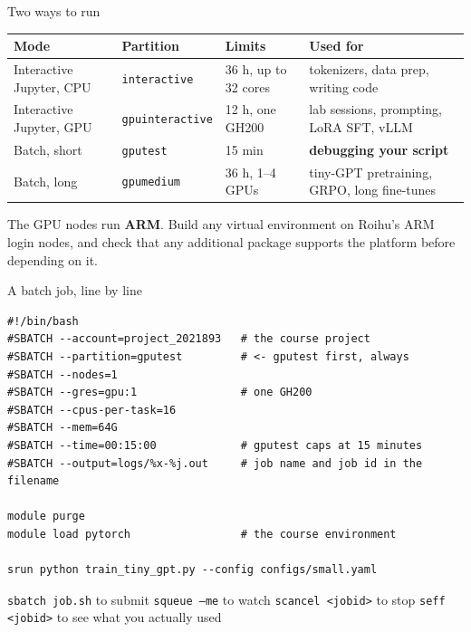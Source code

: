 \documentclass[aspectratio=169,10pt]{beamer}
\begin{document}
\begin{frame}[shrink=9]{Two ways to run}
  \centering
  \begin{tabular}{@{}L{3.1cm} l L{3.3cm} L{3.7cm}@{}}
    \toprule
    \textbf{Mode} & \textbf{Partition} & \textbf{Limits} & \textbf{Used for}\\
    \midrule
    Interactive Jupyter, CPU & \texttt{interactive} & 36 h, up to 32 cores &
      tokenizers, data prep, writing code\\[0.3em]
    Interactive Jupyter, GPU & \texttt{gpuinteractive} & 12 h, one GH200 &
      lab sessions, prompting, LoRA SFT, vLLM\\[0.3em]
    Batch, short & \texttt{gputest} & 15 min & \textbf{debugging your script}\\[0.3em]
    Batch, long & \texttt{gpumedium} & 36 h, 1--4 GPUs &
      tiny-GPT pretraining, GRPO, long fine-tunes\\
    \bottomrule
  \end{tabular}
  \vspace{0.9em}
  \begin{gotcha}
    The GPU nodes run \textbf{ARM}. Build any virtual environment on Roihu's
    ARM login nodes, and check that any additional package supports the
    platform before depending on it.
  \end{gotcha}
\end{frame}

\begin{frame}[fragile]{A batch job, line by line}
\begin{lstlisting}[language=slurm]
#!/bin/bash
#SBATCH --account=project_2021893   # the course project
#SBATCH --partition=gputest         # <- gputest first, always
#SBATCH --nodes=1
#SBATCH --gres=gpu:1                # one GH200
#SBATCH --cpus-per-task=16
#SBATCH --mem=64G
#SBATCH --time=00:15:00             # gputest caps at 15 minutes
#SBATCH --output=logs/%x-%j.out     # job name and job id in the filename

module purge
module load pytorch                 # the course environment

srun python train_tiny_gpt.py --config configs/small.yaml
\end{lstlisting}
  \vspace{0.3em}
  \small
  \texttt{sbatch job.sh} to submit \quad
  \texttt{squeue --me} to watch \quad
  \texttt{scancel <jobid>} to stop \quad
  \texttt{seff <jobid>} to see what you actually used
\end{frame}
\end{document}
